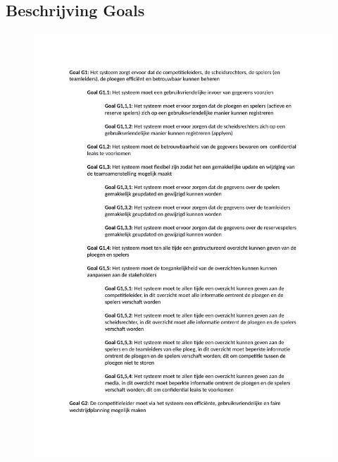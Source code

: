 \documentclass[12pt,a4paper]{article}
\begin{document}
			\subsection{Beschrijving Goals}
			\begin{figure}[H]
				\includegraphics[width=\textwidth]{../2-Doelen/Goals1.pdf}
			\end{figure}
\end{document}
